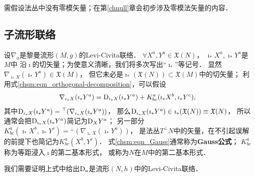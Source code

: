 需假设法丛中没有零模矢量；在第\ref{chnull}章会初步涉及零模法矢量的内容．



\subsection{子流形联络}
设${\nabla}_a$是黎曼流形$({M},{g})$的Levi-Civita联络．
$\forall X^a, Y^a \in \mathfrak{X}(N)$，
$\imath_* X^a, \imath_* Y^a$是${M}$中
沿$\imath$的切矢量；为使意义清晰，我们将多次写出“$\imath_*$”等记号．
显然${\nabla}_{\imath_* X} (\imath_* Y^a) \in \mathfrak{X}({M})$，
但它未必是$\imath_* (\mathfrak{X}(N)) \subset \mathfrak{X}({M})$中的切矢量；
利用式\eqref{chsm:eqn_orthogonal-decomposition}，可以假设 %
\begin{equation}\label{chsm:eqn_Gauss}
    {\nabla}_{\imath_* X} (\imath_*Y^a) = {\rm D}_{\imath_*X} (\imath_*Y^a)
    + K^a_{bc}  (\imath_*X^b, \imath_*Y^c),
\end{equation}
其中${\rm D}_{\imath_*X} (\imath_*Y^a)  = {}^{\top}({\nabla}_{\imath_* X} (\imath_*Y^a))$，
那么$ {\rm D}_{\imath_*X} (\imath_*Y^a) \in \imath_* (\mathfrak{X}(N))\equiv \mathfrak{X}(N) $，
所以通常会把${\rm D}_{\imath_*X} (\imath_*Y^a) $简记为${\rm D}_{X} Y^a $；
另一部分$K^a_{bc}(\imath_*X^b,\imath_*Y^c) = {}^{\bot}({\nabla}_{\imath_* X} (\imath_*Y^a)) $，
是法丛$T^\bot N$中的矢量，在不引起误解的前提下也简记为$K^a_{bc} (X^b ,Y^c)$．
式\eqref{chsm:eqn_Gauss}通常称为{\bfseries\heiti Gauss公式}；
$K^a_{bc}$称为等距浸入$\imath$的{\heiti 第二基本形式}，
或称为$N$在${M}$中的第二基本形式．

我们需要证明上式中给出${\rm D}_a$是流形$(N,h)$中的Levi-Civita联络．





